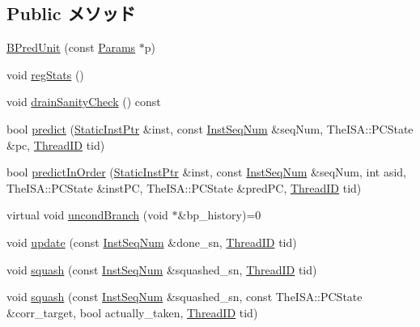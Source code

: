 \subsection*{Public メソッド}
\begin{DoxyCompactItemize}
\item 
\hyperlink{classBPredUnit_a1061023e2f959cf88ef9064923a4667f}{BPredUnit} (const \hyperlink{classBPredUnit_aa715df0f49f029439cca4c7bd6e3d4fb}{Params} $\ast$p)
\item 
void \hyperlink{classBPredUnit_a4dc637449366fcdfc4e764cdf12d9b11}{regStats} ()
\item 
void \hyperlink{classBPredUnit_a0240eb42fa57fe5d3788093f62b77347}{drainSanityCheck} () const 
\item 
bool \hyperlink{classBPredUnit_a9d2ad862133709eece4bf864fe378282}{predict} (\hyperlink{classRefCountingPtr}{StaticInstPtr} \&inst, const \hyperlink{inst__seq_8hh_a258d93d98edaedee089435c19ea2ea2e}{InstSeqNum} \&seqNum, TheISA::PCState \&pc, \hyperlink{base_2types_8hh_ab39b1a4f9dad884694c7a74ed69e6a6b}{ThreadID} tid)
\item 
bool \hyperlink{classBPredUnit_a73a7edc2571c70838069e32ff33a2788}{predictInOrder} (\hyperlink{classRefCountingPtr}{StaticInstPtr} \&inst, const \hyperlink{inst__seq_8hh_a258d93d98edaedee089435c19ea2ea2e}{InstSeqNum} \&seqNum, int asid, TheISA::PCState \&instPC, TheISA::PCState \&predPC, \hyperlink{base_2types_8hh_ab39b1a4f9dad884694c7a74ed69e6a6b}{ThreadID} tid)
\item 
virtual void \hyperlink{classBPredUnit_a17161e0c51444f148e49e4df2ba89704}{uncondBranch} (void $\ast$\&bp\_\-history)=0
\item 
void \hyperlink{classBPredUnit_a6e4be480aeb0d4acfb352802ab73a3df}{update} (const \hyperlink{inst__seq_8hh_a258d93d98edaedee089435c19ea2ea2e}{InstSeqNum} \&done\_\-sn, \hyperlink{base_2types_8hh_ab39b1a4f9dad884694c7a74ed69e6a6b}{ThreadID} tid)
\item 
void \hyperlink{classBPredUnit_af62f441ad740da2cd987637cfa87dfe5}{squash} (const \hyperlink{inst__seq_8hh_a258d93d98edaedee089435c19ea2ea2e}{InstSeqNum} \&squashed\_\-sn, \hyperlink{base_2types_8hh_ab39b1a4f9dad884694c7a74ed69e6a6b}{ThreadID} tid)
\item 
void \hyperlink{classBPredUnit_af5d7fa639b2e7ef3c6449d26f93771a0}{squash} (const \hyperlink{inst__seq_8hh_a258d93d98edaedee089435c19ea2ea2e}{InstSeqNum} \&squashed\_\-sn, const TheISA::PCState \&corr\_\-target, bool actually\_\-taken, \hyperlink{base_2types_8hh_ab39b1a4f9dad884694c7a74ed69e6a6b}{ThreadID} tid)

\end{DoxyCompactItemize}
